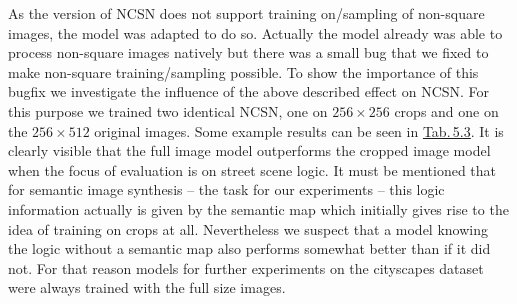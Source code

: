 As the version of NCSN \cite{score_3} does not support training on/sampling of non-square images, the model was adapted to do so. Actually the model already was able to process non-square images natively but there was a small bug that we fixed to make non-square training/sampling possible. To show the importance of this bugfix we investigate the influence of the above described effect on NCSN. For this purpose we trained two identical NCSN, one on $256\times256$ crops and one on the $256\times512$ original images. Some example results can be seen in \hyperref[tab:5.3]{Tab.\,5.3}. It is clearly visible that the full image model outperforms the cropped image model when the focus of evaluation is on street scene logic. It must be mentioned that for semantic image synthesis – the task for our experiments – this logic information actually is given by the semantic map which initially gives rise to the idea of training on crops at all. Nevertheless we suspect that a model knowing the logic without a semantic map also performs somewhat better than if it did not. For that reason models for further experiments on the cityscapes dataset were always trained with the full size images.
